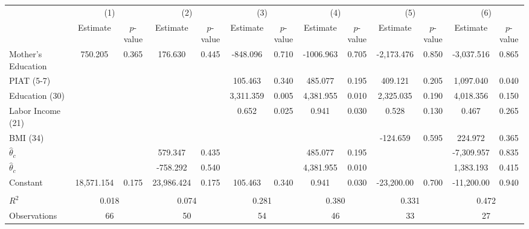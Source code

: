 \begin{tabular}{lcccccccccccc} \toprule
 & \multicolumn{2}{c}{(1)}  &  \multicolumn{2}{c}{(2)}  &  \multicolumn{2}{c}{(3)}  &  \multicolumn{2}{c}{(4)}  & \multicolumn{2}{c}{(5)} & \multicolumn{2}{c}{(6)} \\  
 & Estimate & $p$-value & Estimate & $p$-value & Estimate & $p$-value & Estimate & $p$-value & Estimate & $p$-value & Estimate & $p$-value \\ \midrule
Mother's Education &   750.205 &     0.365 &   176.630 &     0.445 &  -848.096 &     0.710 & -1006.963 &     0.705 & -2,173.476 &     0.850 & -3,037.516 &     0.865 \\  
PIAT (5-7) &         &         &         &         &   105.463 &     0.340 &   485.077 &     0.195 &   409.121 &     0.205 &  1,097.040 &     0.040 \\  
Education (30)  &         &         &         &         &  3,311.359 &     0.005 &  4,381.955 &     0.010 &  2,325.035 &     0.190 &  4,018.356 &     0.150 \\  
Labor Income (21) &         &         &         &         &     0.652 &     0.025 &     0.941 &     0.030 &     0.528 &     0.130 &     0.467 &     0.265 \\  
BMI (34) &         &         &         &         &         &         &         &         &  -124.659 &     0.595 &   224.972 &     0.365 \\  
$\hat{\theta}_{c}$ &         &         &   579.347 &     0.435 &         &         &   485.077 &     0.195 &         &         & -7,309.957 &     0.835 \\  
$\hat{\theta}_{c}$ &         &         &  -758.292 &     0.540 &         &         &  4,381.955 &     0.010 &         &         &  1,383.193 &     0.415 \\  
Constant & 18,571.154 &     0.175 & 23,986.424 &     0.175 &   105.463 &     0.340 &     0.941 &     0.030 & -23,200.00 &     0.700 & -11,200.00 &     0.940 \\ \\ \midrule  
$R^2$ &      \multicolumn{2}{c}{0.018} & \multicolumn{2}{c}{0.074}      &     \multicolumn{2}{c}{0.281} &        \multicolumn{2}{c}{0.380} &  \multicolumn{2}{c}{0.331} &          \multicolumn{2}{c}{0.472}       \\ 
Observations &    \multicolumn{2}{c}{66} &         \multicolumn{2}{c}{50} &        \multicolumn{2}{c}{54}&         \multicolumn{2}{c}{46} &      \multicolumn{2}{c}{33} &        \multicolumn{2}{c}{27}     \\  
\bottomrule \end{tabular}